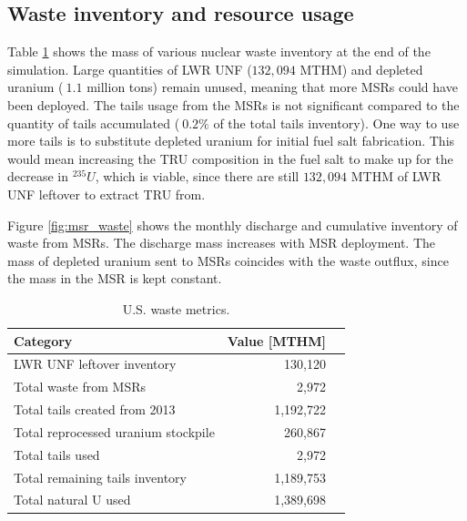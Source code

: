 \subsection{Waste inventory and resource usage}

Table \ref{tab:us_waste} shows the mass of various nuclear waste
inventory at the end of the simulation. Large quantities of \gls{LWR}
\gls{UNF} ($132,094$ MTHM) and depleted uranium ($~1.1$ million tons)
remain unused, meaning that more \glspl{MSR} could have been deployed.
The tails usage from the \glspl{MSR} is not significant compared to
the quantity of tails accumulated ($~0.2\%$ of the total tails inventory).
One way to use more tails
is to substitute depleted uranium for initial
fuel salt fabrication. This would mean increasing the \gls{TRU} composition
in the fuel salt to make up for the decrease in $^{235}U$, which is viable,
since there are still $132,094$ MTHM of \gls{LWR} \gls{UNF} leftover
to extract \gls{TRU} from.

Figure \ref{fig:msr_waste} shows the monthly discharge and cumulative
inventory of waste from \glspl{MSR}. The discharge mass increases with
\gls{MSR} deployment. The mass of depleted uranium sent to \glspl{MSR} coincides
with the waste outflux, since the mass in the \gls{MSR} is kept constant.

\begin{table}[h]
	\centering
	\caption{U.S. waste metrics.}
	\begin{tabular}{lrl}
		\hline
		\textbf{Category} & \textbf{Value [MTHM]} \\
		\hline
			\gls{LWR} \gls{UNF} leftover inventory & 130,120 \\
			Total waste from \gls{MSR}s & 2,972 \\
			Total tails created from 2013 & 1,192,722 \\
			Total reprocessed uranium stockpile & 260,867 \\
			Total tails used & 2,972 \\
			Total remaining tails inventory & 1,189,753 \\
			Total natural U used & 1,389,698 \\
		\hline
	\end{tabular}
	\label{tab:us_waste}
\end{table}



